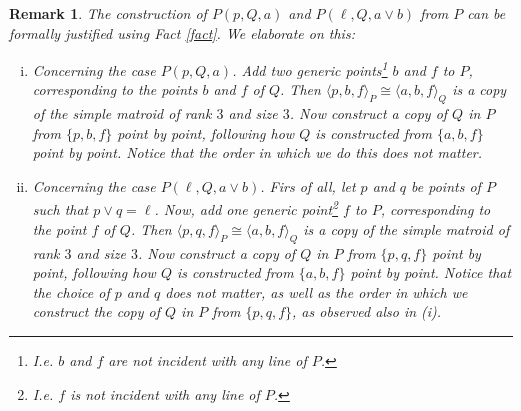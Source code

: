 \documentclass{amsart}
\newtheorem{remark}[theorem]{Remark}
\numberwithin{claimcounter}{theorem}
\begin{document}
	\begin{remark} The construction of $P(p, Q, a)$ and $P(\ell, Q, a \vee b)$ from $P$ can be formally justified using Fact \ref{fact}. We elaborate on this:
	\begin{enumerate}[(i)]
	\item Concerning the case $P(p, Q, a)$. Add two generic points\footnote{I.e. $b$ and $f$ are not incident with any line of $P$.} $b$ and $f$ to $P$, corresponding to the points $b$ and $f$ of $Q$. Then $\langle p, b, f \rangle_P \cong \langle a, b, f \rangle_Q$ is a copy of the simple matroid of rank $3$ and size $3$. Now construct a copy of $Q$ in $P$ from $\{ p, b, f \}$ point by point, following how $Q$ is constructed from $\{ a, b, f \}$ point by point. Notice that the order in which we do this does not matter.
	\item Concerning the case $P(\ell, Q, a \vee b)$. Firs of all, let $p$ and $q$ be points of $P$ such that $p \vee q = \ell$. Now, add one generic point\footnote{I.e. $f$ is not incident with any line of $P$.} $f$ to $P$, corresponding to the point $f$ of $Q$. Then $\langle p, q, f \rangle_P \cong \langle a, b, f \rangle_Q$ is a copy of the simple matroid of rank $3$ and size $3$. Now construct a copy of $Q$ in $P$ from $\{ p, q, f \}$ point by point, following how $Q$ is constructed from $\{ a, b, f \}$ point by point. Notice that the choice of $p$ and $q$ does not matter, as well as the order in which we construct the copy of $Q$ in $P$ from $\{ p, q, f \}$, as observed also in (i).
\end{enumerate}	
\end{remark}
\end{document}
